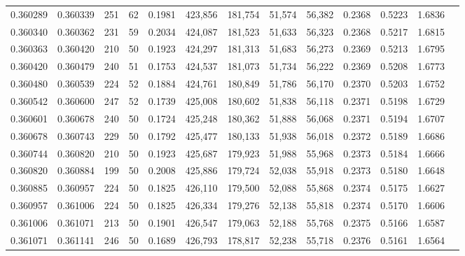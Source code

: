 \begin{tabular}{rrrrrrrrrrrrr}
0.360289 & 0.360339 &   251 &  62 &                                     0.1981 & 423,856 & 181,754 &  51,574 &  56,382 & 0.2368 & 0.5223 & 1.6836 \\
0.360340 & 0.360362 &   231 &  59 &                                     0.2034 & 424,087 & 181,523 &  51,633 &  56,323 & 0.2368 & 0.5217 & 1.6815 \\
0.360363 & 0.360420 &   210 &  50 &                                     0.1923 & 424,297 & 181,313 &  51,683 &  56,273 & 0.2369 & 0.5213 & 1.6795 \\
0.360420 & 0.360479 &   240 &  51 &                                     0.1753 & 424,537 & 181,073 &  51,734 &  56,222 & 0.2369 & 0.5208 & 1.6773 \\
0.360480 & 0.360539 &   224 &  52 &                                     0.1884 & 424,761 & 180,849 &  51,786 &  56,170 & 0.2370 & 0.5203 & 1.6752 \\
0.360542 & 0.360600 &   247 &  52 &                                     0.1739 & 425,008 & 180,602 &  51,838 &  56,118 & 0.2371 & 0.5198 & 1.6729 \\
0.360601 & 0.360678 &   240 &  50 &                                     0.1724 & 425,248 & 180,362 &  51,888 &  56,068 & 0.2371 & 0.5194 & 1.6707 \\
0.360678 & 0.360743 &   229 &  50 &                                     0.1792 & 425,477 & 180,133 &  51,938 &  56,018 & 0.2372 & 0.5189 & 1.6686 \\
0.360744 & 0.360820 &   210 &  50 &                                     0.1923 & 425,687 & 179,923 &  51,988 &  55,968 & 0.2373 & 0.5184 & 1.6666 \\
0.360820 & 0.360884 &   199 &  50 &                                     0.2008 & 425,886 & 179,724 &  52,038 &  55,918 & 0.2373 & 0.5180 & 1.6648 \\
0.360885 & 0.360957 &   224 &  50 &                                     0.1825 & 426,110 & 179,500 &  52,088 &  55,868 & 0.2374 & 0.5175 & 1.6627 \\
0.360957 & 0.361006 &   224 &  50 &                                     0.1825 & 426,334 & 179,276 &  52,138 &  55,818 & 0.2374 & 0.5170 & 1.6606 \\
0.361006 & 0.361071 &   213 &  50 &                                     0.1901 & 426,547 & 179,063 &  52,188 &  55,768 & 0.2375 & 0.5166 & 1.6587 \\
0.361071 & 0.361141 &   246 &  50 &                                     0.1689 & 426,793 & 178,817 &  52,238 &  55,718 & 0.2376 & 0.5161 & 1.6564 \\

\end{tabular}
